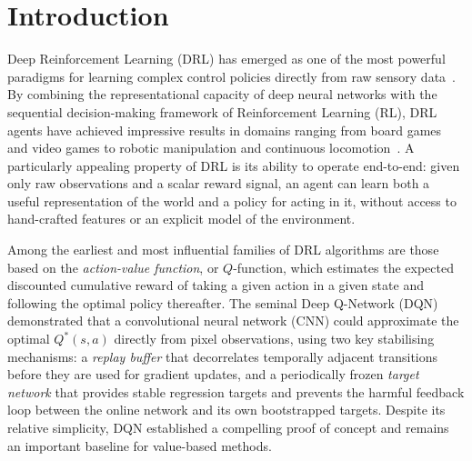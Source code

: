 \section{Introduction}
\label{sec:introduction}

Deep Reinforcement Learning (DRL) has emerged as one of the most powerful
paradigms for learning complex control policies directly from raw sensory
data~\citep{mnih2015humanlevel,silver2016mastering}. By combining the
representational capacity of deep neural networks with the sequential
decision-making framework of Reinforcement Learning (RL), DRL agents have
achieved impressive results in domains ranging from board games and video
games to robotic manipulation and continuous locomotion~\citep{schulman2017proximal,haarnoja2018soft}.
A particularly appealing property of DRL is its ability to operate end-to-end:
given only raw observations and a scalar reward signal, an agent can learn
both a useful representation of the world and a policy for acting in it,
without access to hand-crafted features or an explicit model of the environment.

Among the earliest and most influential families of DRL algorithms are those
based on the \emph{action-value function}, or $Q$-function, which estimates
the expected discounted cumulative reward of taking a given action in a given
state and following the optimal policy thereafter. The seminal
Deep Q-Network (DQN)~\citep{mnih2015humanlevel} demonstrated that a
convolutional neural network (CNN) could approximate the optimal
$Q^{*}(s,a)$ directly from pixel observations, using two key stabilising
mechanisms: a \emph{replay buffer} that decorrelates temporally adjacent
transitions before they are used for gradient updates, and a periodically
frozen \emph{target network} that provides stable regression targets and
prevents the harmful feedback loop between the online network and its own
bootstrapped targets. Despite its relative simplicity, DQN established
a compelling proof of concept and remains an important baseline for
value-based methods.

